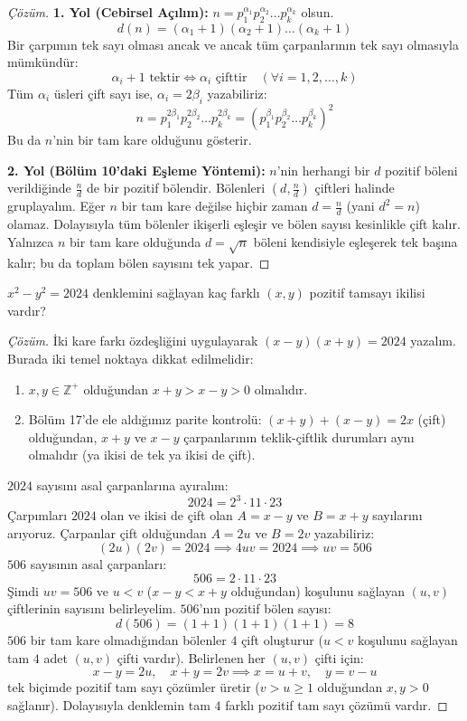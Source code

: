 \begin{proof}[Çözüm]
\textbf{1. Yol (Cebirsel Açılım):}
$n = p_1^{\alpha_1} p_2^{\alpha_2} \dots p_k^{\alpha_k}$ olsun.
\[ d(n) = (\alpha_1 + 1)(\alpha_2 + 1)\dots(\alpha_k + 1) \]
Bir çarpımın tek sayı olması ancak ve ancak tüm çarpanlarının tek sayı olmasıyla mümkündür:
\[ \alpha_i + 1 \text{ tektir} \iff \alpha_i \text{ çifttir} \quad (\forall i = 1, 2, \dots, k) \]
Tüm $\alpha_i$ üsleri çift sayı ise, $\alpha_i = 2\beta_i$ yazabiliriz:
\[ n = p_1^{2\beta_1} p_2^{2\beta_2} \dots p_k^{2\beta_k} = \left( p_1^{\beta_1} p_2^{\beta_2} \dots p_k^{\beta_k} \right)^2 \]
Bu da $n$'nin bir tam kare olduğunu gösterir.

\textbf{2. Yol (Bölüm 10'daki Eşleme Yöntemi):}
$n$'nin herhangi bir $d$ pozitif böleni verildiğinde $\frac{n}{d}$ de bir pozitif bölendir. Bölenleri $(d, \frac{n}{d})$ çiftleri halinde gruplayalım.
Eğer $n$ bir tam kare değilse hiçbir zaman $d = \frac{n}{d}$ (yani $d^2 = n$) olamaz. Dolayısıyla tüm bölenler ikişerli eşleşir ve bölen sayısı kesinlikle çift kalır.
Yalnızca $n$ bir tam kare olduğunda $d = \sqrt{n}$ böleni kendisiyle eşleşerek tek başına kalır; bu da toplam bölen sayısını tek yapar.
\end{proof}

\begin{example}
$x^2 - y^2 = 2024$ denklemini sağlayan kaç farklı $(x, y)$ pozitif tamsayı ikilisi vardır?
\end{example}

\begin{proof}[Çözüm]
İki kare farkı özdeşliğini uygulayarak $(x-y)(x+y) = 2024$ yazalım. Burada iki temel noktaya dikkat edilmelidir:
\begin{enumerate}
    \item $x, y \in \mathbb{Z}^+$ olduğundan $x+y > x-y > 0$ olmalıdır.
    \item Bölüm 17'de ele aldığımız parite kontrolü: $(x+y) + (x-y) = 2x$ (çift) olduğundan, $x+y$ ve $x-y$ çarpanlarının teklik-çiftlik durumları aynı olmalıdır (ya ikisi de tek ya ikisi de çift).
\end{enumerate}
$2024$ sayısını asal çarpanlarına ayıralım:
\[ 2024 = 2^3 \cdot 11 \cdot 23 \]
Çarpımları $2024$ olan ve ikisi de çift olan $A = x-y$ ve $B = x+y$ sayılarını arıyoruz. Çarpanlar çift olduğundan $A = 2u$ ve $B = 2v$ yazabiliriz:
\[ (2u)(2v) = 2024 \implies 4uv = 2024 \implies uv = 506 \]
$506$ sayısının asal çarpanları:
\[ 506 = 2 \cdot 11 \cdot 23 \]
Şimdi $uv = 506$ ve $u < v$ ($x-y < x+y$ olduğundan) koşulunu sağlayan $(u, v)$ çiftlerinin sayısını belirleyelim.
$506$'nın pozitif bölen sayısı:
\[ d(506) = (1+1)(1+1)(1+1) = 8 \]
$506$ bir tam kare olmadığından bölenler $4$ çift oluşturur ($u < v$ koşulunu sağlayan tam $4$ adet $(u, v)$ çifti vardır).
Belirlenen her $(u, v)$ çifti için:
\[ x - y = 2u, \quad x + y = 2v \implies x = u + v, \quad y = v - u \]
tek biçimde pozitif tam sayı çözümler üretir ($v > u \ge 1$ olduğundan $x, y > 0$ sağlanır).
Dolayısıyla denklemin tam $4$ farklı pozitif tam sayı çözümü vardır.
\end{proof}

